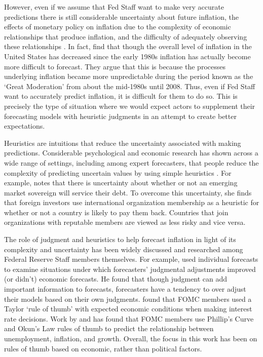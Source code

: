 \documentclass[a4paper]{article}
\begin{document}
However, even if we assume that Fed Staff want to make very accurate predictions there is still considerable uncertainty about future inflation, the effects of monetary policy on inflation due to the complexity of economic relationships that produce inflation, and the difficulty of adequately observing these relationships \cite[see][22-24]{Schonhardt2013}. In fact, \cite{Gamber2009} find that though the overall level of inflation in the United States has decreased since the early 1980s inflation has actually become more difficult to forecast. They argue that this is because the processes underlying inflation became more unpredictable during the period known as the `Great Moderation' from about the mid-1980s until 2008. Thus, even if Fed Staff want to accurately predict inflation, it is difficult for them to do so. This is precisely the type of situation where we would expect actors to supplement their forecasting models with heuristic judgments in an attempt to create better expectations. 

Heuristics are intuitions that reduce the uncertainty associated with making predictions. Considerable psychological and economic research has shown across a wide range of settings, including among expert forecasters, that people reduce the complexity of predicting uncertain values by using simple heuristics \citep[see][]{kahneman1973,tverskykahneman1974,Tversky1983,Kahneman2002,kahneman2003}. For example, \cite{Gray2013} notes that there is uncertainty about whether or not an emerging market sovereign will service their debt. To overcome this uncertainty, she finds that foreign investors use international organization membership as a heuristic for whether or not a country is likely to pay them back. Countries that join organizations with reputable members are viewed as less risky and vice versa.

The role of judgment and heuristics to help forecast inflation in light of its complexity and uncertainty has been widely discussed and researched among Federal Reserve Staff members themselves. For example, \cite{McNees1990} used individual forecasts to examine situations under which forecasters' judgmental adjustments improved (or didn't) economic forecasts. He found that though judgment can add important information to forecasts, forecasters have a tendency to over adjust their models based on their own judgments. \cite{Orphanides2008} found that FOMC members used a Taylor `rule of thumb' with expected economic conditions when making interest rate decisions. Work by \cite{Tillmann2010Philips} and \cite{KnotekII2007} has found that FOMC members use Phillip's Curve and Okun's Law rules of thumb to predict the relationship between unemployment, inflation, and growth. Overall, the focus in this work has been on rules of thumb based on economic, rather than political factors.
\end{document}
